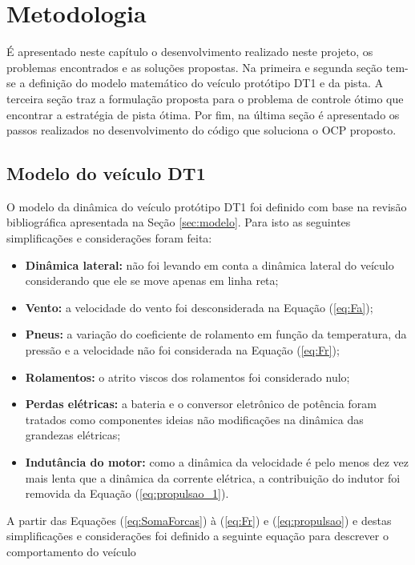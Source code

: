 \chapter{Metodologia}
\label{chap:metodologia}
\thispagestyle{empty}

É apresentado neste capítulo o desenvolvimento realizado neste projeto, os problemas encontrados e as soluções propostas.
Na primeira e segunda seção tem-se a definição do modelo matemático do veículo protótipo DT1 e da pista. A terceira seção traz a formulação proposta para o problema de controle ótimo que encontrar
a estratégia de pista ótima. Por fim, na última  seção é apresentado os passos realizados no desenvolvimento do código que soluciona o OCP proposto. 

\section{Modelo do veículo DT1} 

O modelo da dinâmica do veículo protótipo DT1 foi definido com base na revisão bibliográfica apresentada na Seção \ref{sec:modelo}. 
Para isto as seguintes simplificações e considerações foram feita:

\begin{itemize}
    \item \textbf{Dinâmica lateral:} não foi levando em conta a dinâmica lateral do veículo considerando que ele se move apenas em linha reta; 
    \item \textbf{Vento:} a velocidade do vento foi desconsiderada na Equação (\ref{eq:Fa});
    \item \textbf{Pneus:} a variação do coeficiente de rolamento em função da temperatura, da pressão e a velocidade não foi considerada na Equação (\ref{eq:Fr});
    \item \textbf{Rolamentos:} o atrito viscos dos rolamentos foi considerado nulo;
    \item \textbf{Perdas elétricas:} a bateria e o conversor eletrônico de potência foram tratados como componentes ideias não modificações na dinâmica das grandezas elétricas;
    \item \textbf{Indutância do motor:} como a dinâmica da velocidade é pelo menos dez vez mais lenta que a dinâmica da corrente elétrica, a contribuição do  indutor foi removida da Equação (\ref{eq:propulsao_1}).  
\end{itemize}

A partir das Equações (\ref{eq:SomaForcas}) à (\ref{eq:Fr}) e (\ref{eq:propulsao}) e destas simplificações e considerações foi definido a 
seguinte equação para descrever o comportamento do veículo

